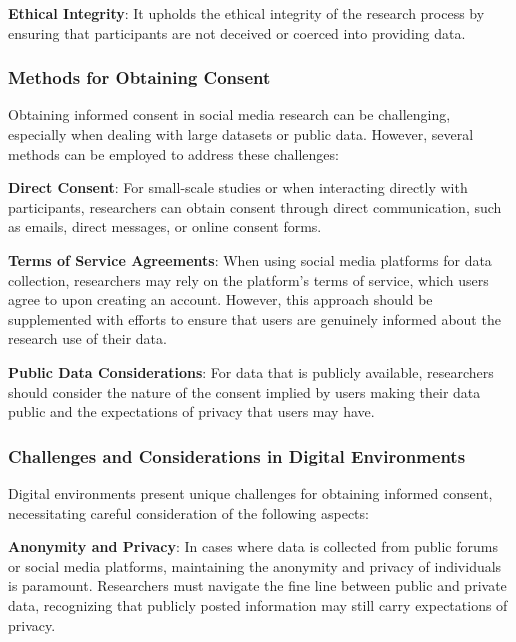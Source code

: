 \documentclass[
]{book}
\begin{document}
\textbf{Ethical Integrity}: It upholds the ethical integrity of the research process by ensuring that participants are not deceived or coerced into providing data.

\hypertarget{methods-for-obtaining-consent}{%
\subsubsection*{Methods for Obtaining Consent}\label{methods-for-obtaining-consent}}

Obtaining informed consent in social media research can be challenging, especially when dealing with large datasets or public data. However, several methods can be employed to address these challenges:

\textbf{Direct Consent}: For small-scale studies or when interacting directly with participants, researchers can obtain consent through direct communication, such as emails, direct messages, or online consent forms.

\textbf{Terms of Service Agreements}: When using social media platforms for data collection, researchers may rely on the platform's terms of service, which users agree to upon creating an account. However, this approach should be supplemented with efforts to ensure that users are genuinely informed about the research use of their data.

\textbf{Public Data Considerations}: For data that is publicly available, researchers should consider the nature of the consent implied by users making their data public and the expectations of privacy that users may have.

\hypertarget{challenges-and-considerations-in-digital-environments}{%
\subsubsection*{Challenges and Considerations in Digital Environments}\label{challenges-and-considerations-in-digital-environments}}

Digital environments present unique challenges for obtaining informed consent, necessitating careful consideration of the following aspects:

\textbf{Anonymity and Privacy}: In cases where data is collected from public forums or social media platforms, maintaining the anonymity and privacy of individuals is paramount. Researchers must navigate the fine line between public and private data, recognizing that publicly posted information may still carry expectations of privacy.
\end{document}
